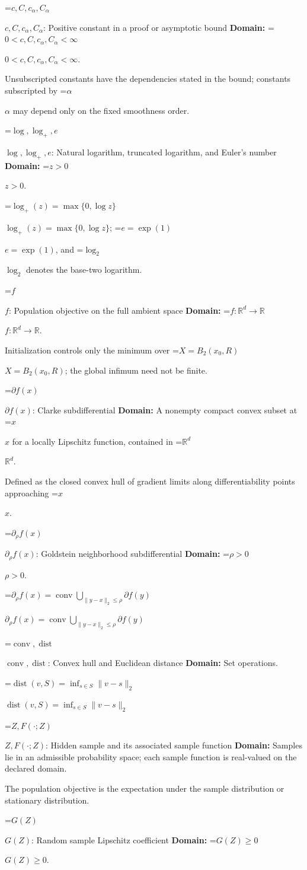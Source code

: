 \documentclass[10pt,a4paper]{article}
\newcommand{\AtlasMath}[1]{\par\begingroup\centering\setbox0=\hbox{$\displaystyle #1$}\ifdim\wd0>1.4\linewidth\typeout{ATLAS WIDE FORMULA: \the\wd0}\fi\ifdim\wd0>\linewidth\resizebox{\linewidth}{!}{\box0}\else\box0\fi\par\endgroup}
\newcommand{\AtlasInlineMath}[1]{\begingroup\setbox0=\hbox{$#1$}\ifdim\wd0>.4\linewidth\endgroup\AtlasMath{#1}\else\endgroup$#1$\fi}
\begin{document}
\AtlasInlineMath{c,C,c_\alpha,C_\alpha}: Positive constant in a proof or asymptotic bound \textbf{Domain:} \AtlasInlineMath{0<c,C,c_\alpha,C_\alpha<\infty}.

Unsubscripted constants have the dependencies stated in the bound; constants subscripted by \AtlasInlineMath{\alpha} may depend only on the fixed smoothness order.

\AtlasInlineMath{\log,\log_+,e}: Natural logarithm, truncated logarithm, and Euler's number \textbf{Domain:} \AtlasInlineMath{z>0}.

\AtlasInlineMath{\log_+(z)=\max\{0,\log z\}}; \AtlasInlineMath{e=\exp(1)}, and \AtlasInlineMath{\log_2} denotes the base-two logarithm.

\AtlasInlineMath{f}: Population objective on the full ambient space \textbf{Domain:} \AtlasInlineMath{f:\mathbb{R}^d\to\mathbb{R}}.

Initialization controls only the minimum over \AtlasInlineMath{X=B_2(x_0,R)}; the global infimum need not be finite.

\AtlasInlineMath{\partial f(x)}: Clarke subdifferential \textbf{Domain:} A nonempty compact convex subset at \AtlasInlineMath{x} for a locally Lipschitz function, contained in \AtlasInlineMath{\mathbb{R}^d}.

Defined as the closed convex hull of gradient limits along differentiability points approaching \AtlasInlineMath{x}.

\AtlasInlineMath{\partial_\rho f(x)}: Goldstein neighborhood subdifferential \textbf{Domain:} \AtlasInlineMath{\rho>0}.

\AtlasInlineMath{\partial_\rho f(x)=\operatorname{conv}\bigcup_{\|y-x\|_2\le\rho}\partial f(y)}

\AtlasInlineMath{\operatorname{conv},\operatorname{dist}}: Convex hull and Euclidean distance \textbf{Domain:} Set operations.

\AtlasInlineMath{\operatorname{dist}(v,S)=\inf_{s\in S}\|v-s\|_2}

\AtlasInlineMath{Z,F(\cdot;Z)}: Hidden sample and its associated sample function \textbf{Domain:} Samples lie in an admissible probability space; each sample function is real-valued on the declared domain.

The population objective is the expectation under the sample distribution or stationary distribution.

\AtlasInlineMath{G(Z)}: Random sample Lipschitz coefficient \textbf{Domain:} \AtlasInlineMath{G(Z)\ge0}.
\end{document}
